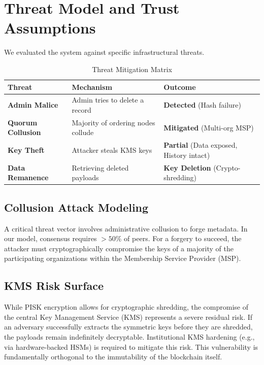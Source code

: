 \documentclass[conference]{IEEEtran}
\begin{document}
\section{Threat Model and Trust Assumptions}
We evaluated the system against specific infrastructural threats.

\begin{table}[htbp]
\caption{Threat Mitigation Matrix}
\begin{center}
\begin{tabular}{p{2.5cm} p{3cm} p{2cm}}
\toprule
\textbf{Threat} & \textbf{Mechanism} & \textbf{Outcome} \\
\midrule
\textbf{Admin Malice} & Admin tries to delete a record & \textbf{Detected} (Hash failure) \\
\midrule
\textbf{Quorum Collusion} & Majority of ordering nodes collude & \textbf{Mitigated} (Multi-org MSP) \\
\midrule
\textbf{Key Theft} & Attacker steals KMS keys & \textbf{Partial} (Data exposed, History intact) \\
\midrule
\textbf{Data Remanence} & Retrieving deleted payloads & \textbf{Key Deletion} (Crypto-shredding) \\
\bottomrule
\end{tabular}
\end{center}
\end{table}

\subsection{Collusion Attack Modeling}
A critical threat vector involves administrative collusion to forge metadata. In our model, consensus requires $>50\%$ of peers. For a forgery to succeed, the attacker must cryptographically compromise the keys of a majority of the participating organizations within the Membership Service Provider (MSP). 

\subsection{KMS Risk Surface}
While PISK encryption allows for cryptographic shredding, the compromise of the central Key Management Service (KMS) represents a severe residual risk. If an adversary successfully extracts the symmetric keys before they are shredded, the payloads remain indefinitely decryptable. Institutional KMS hardening (e.g., via hardware-backed HSMs) is required to mitigate this risk. This vulnerability is fundamentally orthogonal to the immutability of the blockchain itself.
\end{document}
